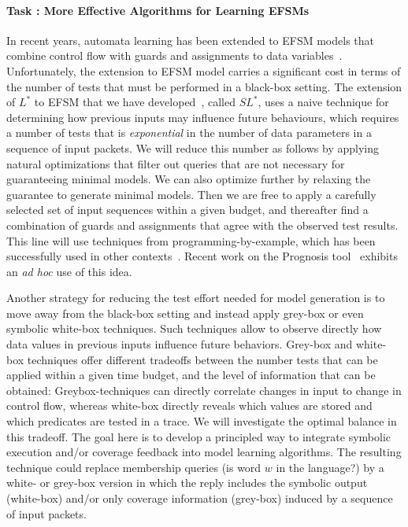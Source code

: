 \documentclass[11pt]{article}
\newcommand{\system}[1]{\mbox{\textsf{#1}}}
\newcounter{Task}
\newcommand{\task}[1]{\addtocounter{Task}{1}\paragraph{Task \theTask: #1}}
\newcommand{\myparagraph}{}
\let\myparagraph=\paragraph
\renewcommand{\paragraph}{\vspace{-3mm}\myparagraph}
\begin{document}
\task{More Effective Algorithms for Learning EFSMs}
In recent years, automata learning has been extended to EFSM models that
combine control flow with guards and assignments to data
variables~\cite{CasselHJS16,AJUV15}.
Unfortunately, the extension to EFSM model carries a significant cost in terms
of the number of tests that must be performed in a black-box setting.
The extension of $L^*$ to EFSM that we have developed~\cite{CasselHJS16}, called $SL^*$, uses a naive technique 
for determining how previous inputs may influence future behaviours, which
requires a number of tests that is \emph{exponential} in the number of data parameters in a
sequence of input packets.
We will reduce this number as follows by applying natural optimizations that
filter out queries that are not necessary for guaranteeing minimal models.
 We can also optimize further by relaxing the guarantee to generate minimal models.
Then we are free to apply a carefully selected set of input sequences within a given budget, and thereafter find a combination of guards and assignments that agree with the observed test results. This line will use techniques from programming-by-example, which has been successfully used in other contexts~\cite{GulwaniPS17}. Recent work on the Prognosis tool~\cite{Prognosis@SIGCOMM-21} exhibits an \emph{ad hoc} use of this idea.

Another strategy for reducing the test effort needed for model generation is to move away from
the black-box setting and instead apply grey-box or even symbolic white-box techniques. Such techniques allow to
observe directly how data values in previous inputs influence future behaviors. Grey-box and white-box techniques offer
different tradeoffs between the number tests that can be applied within a given time budget, and the level of information that
can be obtained: Greybox-techniques can directly correlate changes in input to change in control flow, whereas white-box
directly reveals which values are stored and which predicates are tested in a trace.
We will investigate the optimal balance in this tradeoff.
The goal here is to develop a principled way to integrate symbolic execution and/or coverage feedback into model learning algorithms.
The resulting technique could replace membership queries (is word $w$ in the language?) by a white- or grey-box
version in which the reply includes the symbolic output (white-box) and/or only coverage information (grey-box) induced by a
sequence of input packets.
\end{document}
